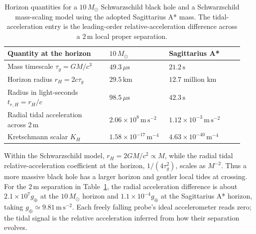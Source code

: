 \documentclass[12pt]{article}
\begin{document}
\begin{table}[H]
  \centering
  \small
  \begin{tabular}{@{}p{0.41\linewidth}p{0.23\linewidth}p{0.30\linewidth}@{}}
    \toprule
    Quantity at the horizon & $10\,M_\odot$ & Sagittarius A* \\
    \midrule
    Mass timescale $\tau_g=GM/c^3$
      & $49.3\,\mu\mathrm{s}$ & $21.2\,\mathrm{s}$ \\
    Horizon radius $r_H=2c\tau_g$
      & $29.5\,\mathrm{km}$ & $12.7$ million $\mathrm{km}$ \\
    Radius in light-seconds $t_{r,H}=r_H/c$
      & $98.5\,\mu\mathrm{s}$ & $42.3\,\mathrm{s}$ \\
    Radial tidal acceleration across $2\,\mathrm{m}$
      & $2.06\times10^8\,\mathrm{m\,s^{-2}}$
      & $1.12\times10^{-3}\,\mathrm{m\,s^{-2}}$ \\
    Kretschmann scalar $K_H$
      & $1.58\times10^{-17}\,\mathrm{m^{-4}}$
      & $4.63\times10^{-40}\,\mathrm{m^{-4}}$ \\
    \bottomrule
  \end{tabular}
  \caption{Horizon quantities for a $10\,M_\odot$ Schwarzschild black hole and a Schwarzschild mass-scaling model using the adopted Sagittarius A* mass. The tidal-acceleration entry is the leading-order relative-acceleration difference across a $2\,\mathrm{m}$ local proper separation.}
  \label{tab:numerical-horizon-comparison}
\end{table}

\clearpage

Within the Schwarzschild model, $r_H=2GM/c^2\propto M$, while the radial tidal relative-acceleration coefficient at the horizon, $1/(4\tau_g^2)$, scales as $M^{-2}$. Thus a more massive black hole has a larger horizon and gentler local tides at crossing. For the $2\,\mathrm{m}$ separation in Table~\ref{tab:numerical-horizon-comparison}, the radial acceleration difference is about $2.1\times10^7g_\oplus$ at the $10\,M_\odot$ horizon and $1.1\times10^{-4}g_\oplus$ at the Sagittarius A* horizon, taking $g_\oplus\simeq9.81\,\mathrm{m\,s^{-2}}$. Each freely falling probe's ideal accelerometer reads zero; the tidal signal is the relative acceleration inferred from how their separation evolves.
\end{document}
